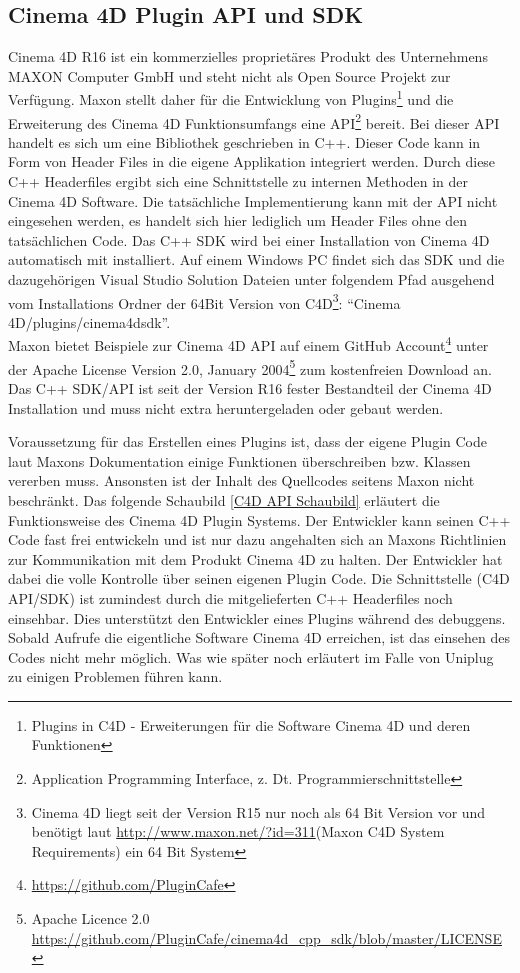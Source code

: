 \documentclass[pagesize, paper=a4, fontsize=12pt, titlepage=true, headings=small, headnosepline, abstractoff, liststotoc, nochapterprefix, plainheadsepline, twoside]{scrreprt}
\begin{document}
\subsection{Cinema 4D Plugin API und SDK}
Cinema 4D R16 \autocite{MaxonC4d2014} ist ein kommerzielles proprietäres Produkt des Unternehmens MAXON Computer GmbH und steht nicht als Open Source Projekt zur Verfügung. Maxon stellt daher für die Entwicklung von Plugins\footnote{Plugins in C4D - Erweiterungen für die Software Cinema 4D und deren Funktionen} und die Erweiterung des Cinema 4D Funktionsumfangs eine API\footnote{Application Programming Interface, z. Dt. Programmierschnittstelle} bereit. Bei dieser API handelt es sich um eine Bibliothek geschrieben in C++. Dieser Code kann in Form von Header Files in die eigene Applikation integriert werden. Durch diese C++ Headerfiles ergibt sich eine Schnittstelle zu internen Methoden in der Cinema 4D Software. Die tatsächliche Implementierung kann mit der API nicht eingesehen werden, es handelt sich hier lediglich um Header Files ohne den tatsächlichen Code. Das C++ SDK wird bei einer Installation von Cinema 4D automatisch mit installiert. Auf einem Windows PC findet sich das SDK und die dazugehörigen Visual Studio Solution Dateien unter folgendem Pfad ausgehend vom Installations Ordner der 64Bit Version von C4D\footnote{Cinema 4D liegt seit der Version R15 nur noch als 64 Bit Version vor und benötigt laut \url{http://www.maxon.net/?id=311}(Maxon C4D System Requirements) ein 64 Bit System}: {“Cinema 4D/plugins/cinema4dsdk”}.
\\
Maxon bietet Beispiele zur Cinema 4D API auf einem GitHub Account\footnote{\url{https://github.com/PluginCafe}} unter der Apache License Version 2.0, January 2004\footnote{Apache Licence 2.0 \url{https://github.com/PluginCafe/cinema4d_cpp_sdk/blob/master/LICENSE}} zum kostenfreien Download an. Das C++ SDK/API ist seit der Version R16 fester Bestandteil der Cinema 4D Installation und muss nicht extra heruntergeladen oder gebaut werden.

Voraussetzung für das Erstellen eines Plugins ist, dass der eigene Plugin Code laut Maxons Dokumentation einige Funktionen überschreiben bzw. Klassen vererben muss. Ansonsten ist der Inhalt des Quellcodes seitens Maxon nicht beschränkt. Das folgende Schaubild \ref{C4D API Schaubild} erläutert die Funktionsweise des Cinema 4D Plugin Systems. Der Entwickler kann seinen C++ Code fast frei entwickeln und ist nur dazu angehalten sich an Maxons Richtlinien zur Kommunikation mit dem Produkt Cinema 4D zu halten. Der Entwickler hat dabei die volle Kontrolle über seinen eigenen Plugin Code. Die Schnittstelle (C4D API/SDK) ist zumindest durch die mitgelieferten C++ Headerfiles noch einsehbar. Dies unterstützt den Entwickler eines Plugins während des debuggens. Sobald Aufrufe die eigentliche Software Cinema 4D erreichen, ist das einsehen des Codes nicht mehr möglich. Was wie später noch erläutert im Falle von Uniplug zu einigen Problemen führen kann.
\end{document}
